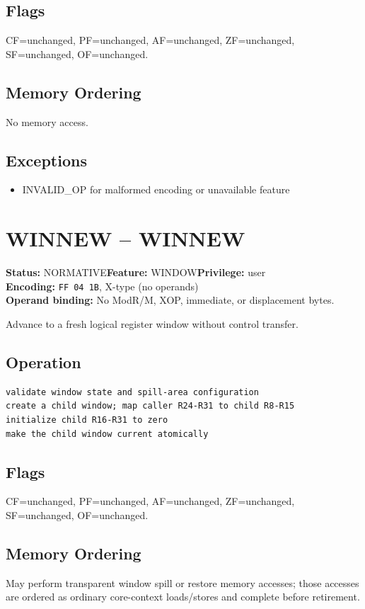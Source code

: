 \documentclass[10pt]{article}
\begin{document}
\subsection*{Flags}
CF=unchanged, PF=unchanged, AF=unchanged, ZF=unchanged, SF=unchanged, OF=unchanged.
\subsection*{Memory Ordering}
No memory access.
\subsection*{Exceptions}
\begin{itemize}
\item INVALID\_OP for malformed encoding or unavailable feature
\end{itemize}
\clearpage

\section{WINNEW -- WINNEW}
\textbf{Status:} NORMATIVE\quad \textbf{Feature:} WINDOW\quad \textbf{Privilege:} user\\
\textbf{Encoding:} \texttt{FF 04 1B}, X-type (no operands)\\
\textbf{Operand binding:} No ModR/M, XOP, immediate, or displacement bytes.

Advance to a fresh logical register window without control transfer.

\subsection*{Operation}
\begin{lstlisting}
validate window state and spill-area configuration
create a child window; map caller R24-R31 to child R8-R15
initialize child R16-R31 to zero
make the child window current atomically
\end{lstlisting}
\subsection*{Flags}
CF=unchanged, PF=unchanged, AF=unchanged, ZF=unchanged, SF=unchanged, OF=unchanged.
\subsection*{Memory Ordering}
May perform transparent window spill or restore memory accesses; those accesses are ordered as ordinary core-context loads/stores and complete before retirement.
\end{document}
